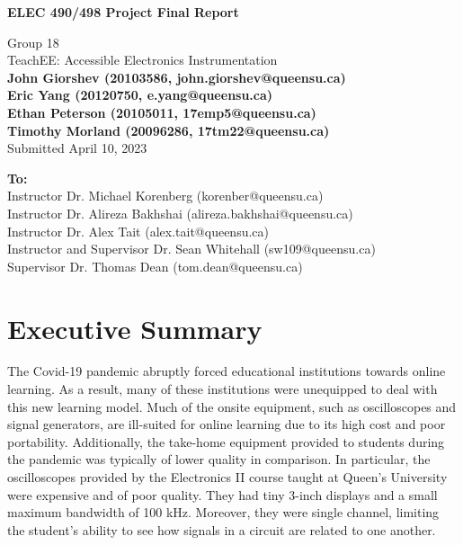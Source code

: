 \documentclass[letterpaper,11pt]{article}
\begin{document}
\begin{titlepage}
    \begin{center}
        \vspace*{1cm}

        \Large
        \textbf{ELEC 490/498 Project Final Report}

        \vspace{0.5cm}
        Group 18\\
        TeachEE: Accessible Electronics Instrumentation\\
        \vspace{0.5cm}
        \normalsize
        \textbf{John Giorshev (20103586, john.giorshev@queensu.ca) \\ Eric Yang (20120750, e.yang@queensu.ca) \\ Ethan Peterson (20105011, 17emp5@queensu.ca) \\ Timothy Morland (20096286, 17tm22@queensu.ca)}\\
        \vspace{0.5cm}
        Submitted April 10, 2023\\

        \vfill
            
        \textbf{To:}\\
        Instructor Dr. Michael Korenberg (korenber@queensu.ca) \\
        Instructor Dr. Alireza Bakhshai (alireza.bakhshai@queensu.ca) \\
        Instructor Dr. Alex Tait (alex.tait@queensu.ca) \\
        Instructor and Supervisor Dr. Sean Whitehall (sw109@queensu.ca) \\
        Supervisor Dr. Thomas Dean (tom.dean@queensu.ca) \\
            
        \vspace{1.8cm}

    \end{center}
\end{titlepage}
\section*{Executive Summary}
The Covid-19 pandemic abruptly forced educational institutions towards online
learning. As a result, many of these institutions were unequipped to deal with
this new learning model. Much of the onsite equipment, such as oscilloscopes and
signal generators, are ill-suited for online learning due to its high cost and
poor portability. Additionally, the take-home equipment provided to students
during the pandemic was typically of lower quality in comparison. In particular,
the oscilloscopes provided by the Electronics II course taught at Queen's
University were expensive and of poor quality. They had tiny 3-inch displays and
a small maximum bandwidth of 100 kHz. Moreover, they were single channel,
limiting the student's ability to see how signals in a circuit are related to
one another.
\end{document}
